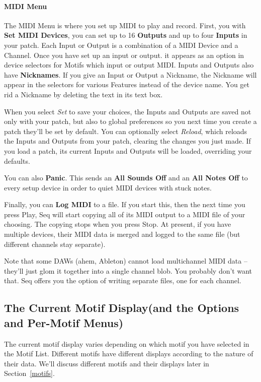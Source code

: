 \documentclass[twoside,10pt]{article}
\begin{document}
\paragraph{MIDI Menu}

The MIDI Menu is where you set up MIDI to play and record.  First, you with {\bf Set MIDI Devices}, you can set up to 16 {\bf Outputs} and up to four {\bf Inputs} in your patch.  Each Input or Output is a combination of a MIDI Device and a Channel.  Once you have set up an input or output. it appears as an option in device selectors for Motifs which input or output MIDI.  
Inputs and Outputs also have {\bf Nicknames}.  If you give an Input or Output a Nickname, the Nickname will appear in the selectors for various Features instead of the device name.  You get rid a Nickname by deleting the text in its text box.

When you select {\it Set} to save your choices, the Inputs and Outputs are saved not only with your patch, but also to global preferences so you next time you create a patch they'll be set by default.  You can optionally select {\it Reload}, which reloads the Inputs and Outputs from your patch, clearing the changes you just made.  If you load a patch, its current Inputs and Outputs will be loaded, overriding your defaults.

You can also {\bf Panic}.  This sends an {\bf All Sounds Off} and an {\bf All Notes Off} to every setup device in order to quiet MIDI devices with stuck notes.

Finally, you can {\bf Log MIDI} to a file.  If you start this, then the next time you press Play, Seq will start copying all of its MIDI output to a MIDI file of your choosing.  The copying stops when you press Stop.  At present, if you have multiple devices, their MIDI data is merged and logged to the same file (but different channels stay separate).  

Note that some DAWs (ahem, Ableton) cannot load multichannel MIDI data -- they'll just glom it together into a single channel blob.  You probably don't want that.  Seq offers you the option of writing separate files, one for each channel.

\subsection{The Current Motif Display\quad (and the Options and Per-Motif Menus)}

The current motif display varies depending on which motif you have selected in the Motif List.  Different motifs have different displays according to the nature of their data.  We'll discuss different motifs and their displays later in Section~\ref{motifs}.  
\end{document}

